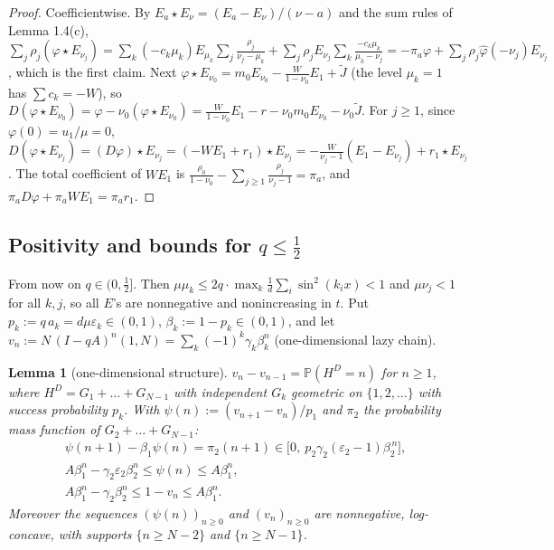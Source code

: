 \documentclass[11pt,a4paper]{article}
\newtheorem{lemma}[theorem]{Lemma}
\theoremstyle{definition}
\theoremstyle{remark}
\begin{document}
\begin{proof}
Coefficientwise. By $E_a\star E_\nu=(E_a-E_\nu)/(\nu-a)$ and the sum rules of Lemma 1.4(c), $\sum_j\rho_j(\varphi\star E_{\nu_j})=\sum_k(-c_k\mu_k)E_{\mu_k}\sum_j\frac{\rho_j}{\nu_j-\mu_k}+\sum_j\rho_jE_{\nu_j}\sum_k\frac{-c_k\mu_k}{\mu_k-\nu_j}=-\pi_a\varphi+\sum_j\rho_j\hat\varphi(-\nu_j)E_{\nu_j}$, which is the first claim. Next $\varphi\star E_{\nu_0}=m_0E_{\nu_0}-\frac{W}{1-\nu_0}E_1+\tilde J$ (the level $\mu_k=1$ has $\sum c_k=-W$), so $D(\varphi\star E_{\nu_0})=\varphi-\nu_0(\varphi\star E_{\nu_0})=\frac{W}{1-\nu_0}E_1-r-\nu_0m_0E_{\nu_0}-\nu_0\tilde J$. For $j\ge1$, since $\varphi(0)=u_1/\mu=0$, $D(\varphi\star E_{\nu_j})=(D\varphi)\star E_{\nu_j}=(-WE_1+r_1)\star E_{\nu_j}=-\frac{W}{\nu_j-1}(E_1-E_{\nu_j})+r_1\star E_{\nu_j}$. The total coefficient of $WE_1$ is $\frac{\rho_0}{1-\nu_0}-\sum_{j\ge1}\frac{\rho_j}{\nu_j-1}=\pi_a$, and $\pi_aD\varphi+\pi_aWE_1=\pi_ar_1$.
\end{proof}

\subsection{Positivity and bounds for $q\le\frac12$}

From now on $q\in(0,\frac12]$. Then $\mu\mu_k\le2q\cdot\max_k\frac1d\sum_i\sin^2(k_ix)<1$ and $\mu\nu_j<1$ for all $k,j$, so all $E$'s are nonnegative and nonincreasing in $t$. Put $p_k:=q\,a_k=d\mu\varepsilon_k\in(0,1)$, $\beta_k:=1-p_k\in(0,1)$, and let $v_n:=N\,(I-qA)^n(1,N)=\sum_k(-1)^k\gamma_k\beta_k^n$ (one-dimensional lazy chain).

\begin{lemma}[{one-dimensional structure}]
$v_{n}-v_{n-1}=\mathbb P(H^D=n)$ for $n\ge1$, where $H^D=G_1+\dots+G_{N-1}$ with independent $G_k$ geometric on $\{1,2,\dots\}$ with success probability $p_k$. With $\psi(n):=(v_{n+1}-v_n)/p_1$ and $\pi_2$ the probability mass function of $G_2+\dots+G_{N-1}$:
\begin{gather*}
\psi(n+1)-\beta_1\psi(n)=\pi_2(n+1)\in\bigl[0,\ p_2\gamma_2(\varepsilon_2-1)\beta_2^{\,n}\bigr], \\
A\beta_1^n-\gamma_2\varepsilon_2\beta_2^n\le\psi(n)\le A\beta_1^n, \\
A\beta_1^n-\gamma_2\beta_2^n\le1-v_n\le A\beta_1^n .
\end{gather*}
Moreover the sequences $(\psi(n))_{n\ge0}$ and $(v_n)_{n\ge0}$ are nonnegative, log-concave, with supports $\{n\ge N-2\}$ and $\{n\ge N-1\}$.
\end{lemma}
\end{document}
